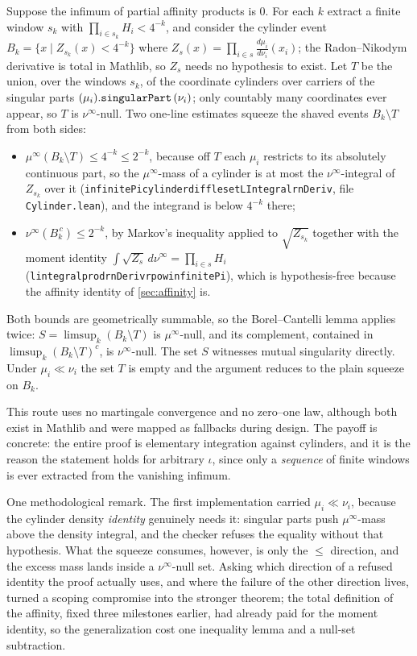 \documentclass[a4paper,UKenglish,autoref,thm-restate]{lipics-v2021}
\newcommand{\leanid}[1]{{\def\_{\textunderscore\allowbreak}\texttt{#1}}}
\begin{document}
Suppose the infimum of partial affinity products is $0$. For each $k$ extract
a finite window $s_k$ with $\prod_{i \in s_k} H_i < 4^{-k}$, and consider the
cylinder event $B_k = \{x \mid Z_{s_k}(x) < 4^{-k}\}$ where
$Z_s(x) = \prod_{i \in s}\frac{d\mu_i}{d\nu_i}(x_i)$; the Radon--Nikodym
derivative is total in Mathlib, so $Z_s$ needs no hypothesis to exist. Let
$T$ be the union, over the windows $s_k$, of the coordinate cylinders over
carriers of the singular parts $(\mu_i).\leanid{singularPart}\,(\nu_i)$; only
countably many coordinates ever appear, so $T$ is $\nu^\infty$-null. Two
one-line estimates squeeze the shaved events $B_k \setminus T$ from both
sides:
\begin{itemize}
\item $\mu^\infty(B_k \setminus T) \le 4^{-k} \le 2^{-k}$, because off $T$
  each $\mu_i$ restricts to its absolutely continuous part, so the
  $\mu^\infty$-mass of a cylinder is at most the $\nu^\infty$-integral of
  $Z_{s_k}$ over it
  (\leanid{infinitePi\_cylinder\_diff\_le\_setLIntegral\_rnDeriv},
  file \texttt{Cylinder.lean}), and the integrand is below $4^{-k}$ there;
\item $\nu^\infty(B_k^{\,c}) \le 2^{-k}$, by Markov's inequality applied to
  $\sqrt{Z_{s_k}}$ together with the moment identity
  $\int \sqrt{Z_s}\, d\nu^\infty = \prod_{i \in s} H_i$
  (\leanid{lintegral\_prod\_rnDeriv\_rpow\_infinitePi}), which is
  hypothesis-free because the affinity identity of \autoref{sec:affinity} is.
\end{itemize}
Both bounds are geometrically summable, so the Borel--Cantelli lemma applies
twice: $S = \limsup_k (B_k \setminus T)$ is $\mu^\infty$-null, and its
complement, contained in $\limsup_k (B_k \setminus T)^{c}$, is
$\nu^\infty$-null. The set $S$ witnesses mutual singularity directly. Under
$\mu_i \ll \nu_i$ the set $T$ is empty and the argument reduces to the plain
squeeze on $B_k$.

This route uses no martingale convergence and no zero--one law, although both
exist in Mathlib and were mapped as fallbacks during design. The payoff is
concrete: the entire proof is elementary integration against cylinders, and it
is the reason the statement holds for arbitrary $\iota$, since only a
\emph{sequence} of finite windows is ever extracted from the vanishing
infimum.

One methodological remark. The first implementation carried
$\mu_i \ll \nu_i$, because the cylinder density \emph{identity} genuinely
needs it: singular parts push $\mu^\infty$-mass above the density integral,
and the checker refuses the equality without that hypothesis. What the squeeze consumes,
however, is only the $\le$ direction, and the excess mass lands inside a
$\nu^\infty$-null set. Asking which direction of a refused identity the proof
actually uses, and where the failure of the other direction lives, turned a
scoping compromise into the stronger theorem; the total definition of the
affinity, fixed three milestones earlier, had already paid for the moment
identity, so the generalization cost one inequality lemma and a null-set
subtraction.
\end{document}
